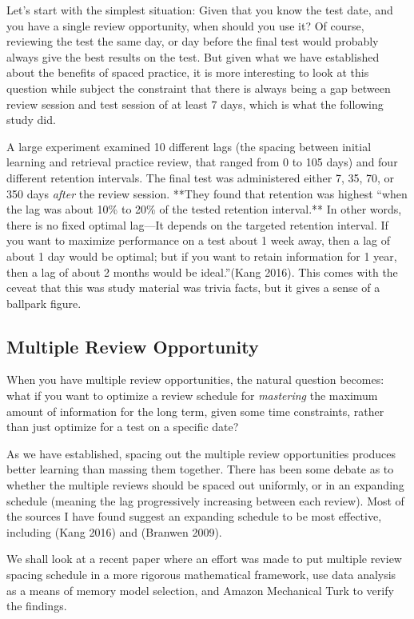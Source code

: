 Let's start with the simplest situation: Given that you know the test
date, and you have a single review opportunity, when should you use it?
Of course, reviewing the test the same day, or day before the final test
would probably always give the best results on the test. But given what
we have established about the benefits of spaced practice, it is more
interesting to look at this question while subject the constraint that
there is always being a gap between review session and test session of
at least 7 days, which is what the following study did.

A large experiment examined 10 different lags (the spacing between
initial learning and retrieval practice review, that ranged from 0 to
105 days) and four different retention intervals. The final test was
administered either 7, 35, 70, or 350 days \emph{after} the review
session. **They found that retention was highest ``when the lag was
about 10\% to 20\% of the tested retention interval.** In other words,
there is no fixed optimal lag---It depends on the targeted retention
interval. If you want to maximize performance on a test about 1 week
away, then a lag of about 1 day would be optimal; but if you want to
retain information for 1 year, then a lag of about 2 months would be
ideal.''(Kang 2016). This comes with the ceveat that this was study
material was trivia facts, but it gives a sense of a ballpark figure.

\subsection{Multiple Review
Opportunity}\label{multiple-review-opportunity}

When you have multiple review opportunities, the natural question
becomes: what if you want to optimize a review schedule for
\emph{mastering} the maximum amount of information for the long term,
given some time constraints, rather than just optimize for a test on a
specific date?

As we have established, spacing out the multiple review opportunities
produces better learning than massing them together. There has been some
debate as to whether the multiple reviews should be spaced out
uniformly, or in an expanding schedule (meaning the lag progressively
increasing between each review). Most of the sources I have found
suggest an expanding schedule to be most effective, including (Kang
2016) and (Branwen 2009).

We shall look at a recent paper where an effort was made to put multiple
review spacing schedule in a more rigorous mathematical framework, use
data analysis as a means of memory model selection, and Amazon
Mechanical Turk to verify the findings.

